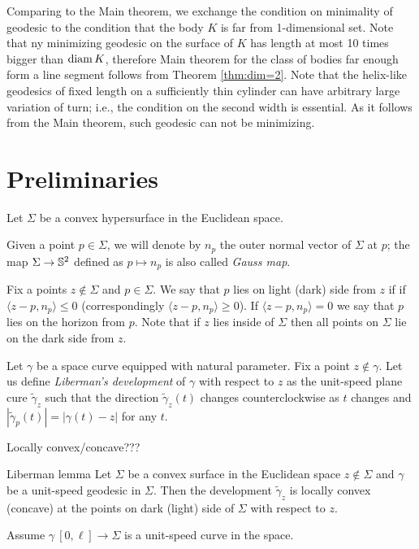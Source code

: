 \documentclass[a4paper,10pt]{amsart}
\begin{document}
Comparing to the Main theorem, we exchange the condition on minimality of geodesic to the condition that the body $K$ is far from 1-dimensional set.
Note that ny minimizing geodesic on the surface of $K$ has length at most 10 times bigger than $\operatorname{diam} K$, therefore Main theorem for the class of bodies far enough form a line segment follows from Theorem \ref{thm:dim=2}.
Note that the helix-like geodesics of fixed length 
on a sufficiently thin cylinder 
can have arbitrary large variation of turn;
i.e., the condition on the second width is essential.
As it follows from the Main theorem, such geodesic can not be minimizing.

\section{Preliminaries}

Let $\Sigma$ be a convex hypersurface in the Euclidean space.

Given a point $p\in \Sigma$, we will denote by $n_p$ the outer normal vector of $\Sigma$ at $p$;
the map $\Sigma\to\mathbb{S}^2$ defined as $p\mapsto n_p$ is also called \emph{Gauss map}.

Fix a points $z\notin\Sigma$ and $p\in \Sigma$.
We say that $p$ lies on light (dark) side from $z$ if 
if $\langle z-p,n_p\rangle\le 0$ (correspondingly $\langle z-p,n_p\rangle\ge 0$).
If $\langle z-p,n_p\rangle= 0$ we say that $p$ lies on the horizon
from $p$.
Note that if $z$ lies inside of $\Sigma$ then all points on $\Sigma$ lie on the dark side from $z$.

Let $\gamma$ be a space curve equipped with natural parameter.
Fix a point $z\notin\gamma$. 
Let us define \emph{Liberman's development} of $\gamma$ with respect to $z$ as the unit-speed plane cure $\tilde\gamma_z$ such that the direction $\tilde\gamma_z(t)$
changes counterclockwise as $t$ changes
and
$|\tilde\gamma_p(t)|=|\gamma(t)-z|$ for any $t$.

Locally convex/concave???


\begin{thm}{Liberman lemma}\label{lem:liberman}
Let $\Sigma$ be a convex surface in the Euclidean space 
$z\not\in\Sigma$ and $\gamma$ be a unit-speed geodesic in $\Sigma$.
Then the development $\tilde\gamma_z$ is locally convex (concave) 
at the points on dark (light) side of $\Sigma$ with respect to $z$.
\end{thm}

Assume $\gamma\:[0,\ell]\to \Sigma$ is a unit-speed curve in the space.
\end{document}
